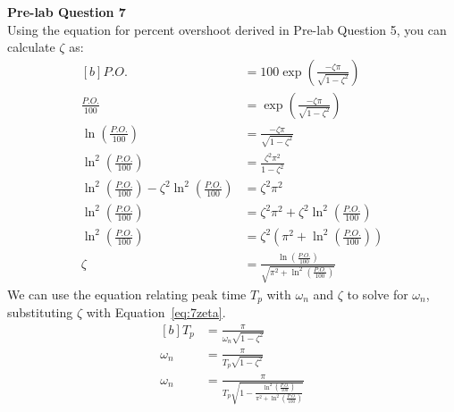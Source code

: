 \documentclass[12pt]{article}
\begin{document}
\textbf{Pre-lab Question 7} \\
Using the equation for percent overshoot derived in Pre-lab Question 5, you can calculate $\zeta$ as:
\begin{equation} \label{eq:7zeta}
\begin{aligned}[b]
    P.O. &= 100\exp\left(\frac{-\zeta\pi}{\sqrt{1-\zeta^2}}\right) \\
    \frac{P.O.}{100} &= \exp\left(\frac{-\zeta\pi}{\sqrt{1-\zeta^2}}\right) \\
    \ln \left( \frac{P.O.}{100} \right) &= \frac{-\zeta\pi}{\sqrt{1-\zeta^2}} \\
    \ln^2 \left( \frac{P.O.}{100} \right) &= \frac{\zeta^2\pi^2}{1-\zeta^2} \\
    \ln^2 \left( \frac{P.O.}{100} \right) - \zeta^2 \ln^2 \left( \frac{P.O.}{100} \right) &= \zeta^2\pi^2 \\
    \ln^2 \left( \frac{P.O.}{100} \right) &= \zeta^2\pi^2 + \zeta^2 \ln^2 \left( \frac{P.O.}{100} \right) \\
    \ln^2 \left( \frac{P.O.}{100} \right) &= \zeta^2 \left( \pi^2 + \ln^2 \left( \frac{P.O.}{100} \right) \right) \\
    \zeta &= \frac{\ln \left( \frac{P.O.}{100} \right)}{\sqrt{\pi^2 + \ln^2 \left( \frac{P.O.}{100} \right)}}
\end{aligned}
\end{equation}
We can use the equation relating peak time $T_p$ with $\omega_n$ and $\zeta$ to solve for $\omega_n$, substituting $\zeta$ with Equation~\ref{eq:7zeta}. 
\begin{equation} \label{eq:7omegan}
\begin{aligned}[b]
    T_p &= \frac{\pi}{\omega_n\sqrt{1-\zeta^2}} \\
    \omega_n &= \frac{\pi}{T_p\sqrt{1-\zeta^2}} \\
    \omega_n &= \frac{\pi}{T_p\sqrt{1 - \frac{\ln^2 \left( \frac{P.O.}{100} \right)}{\pi^2 + \ln^2 \left( \frac{P.O.}{100} \right)}}}
\end{aligned}
\end{equation}
\end{document}
